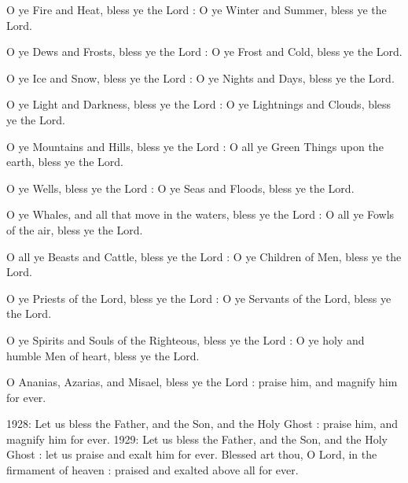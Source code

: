 O ye Fire and Heat, bless ye the Lord : O ye Winter and Summer, bless ye the Lord.

O ye Dews and Frosts, bless ye the Lord : O ye Frost and Cold, bless ye the Lord.

O ye Ice and Snow, bless ye the Lord : O ye Nights and Days, bless ye the Lord.

O ye Light and Darkness, bless ye the Lord : O ye Lightnings and Clouds, bless ye the Lord.


O ye Mountains and Hills, bless ye the Lord : O all ye Green Things upon the earth, bless ye the Lord.

O ye Wells, bless ye the Lord : O ye Seas and Floods, bless ye the Lord.

O ye Whales, and all that move in the waters, bless ye the Lord : O all ye Fowls of the air, bless ye the Lord.

O all ye Beasts and Cattle, bless ye the Lord : O ye Children of Men, bless ye the Lord.


O ye Priests of the Lord, bless ye the Lord : O ye Servants of the Lord, bless ye the Lord.

O ye Spirits and Souls of the Righteous, bless ye the Lord : O ye holy and humble Men of heart, bless ye the Lord.

O Ananias, Azarias, and Misael, bless ye the Lord : praise him, and magnify him for ever.

1928: Let us bless the Father, and the Son, and the Holy Ghost : praise him, and magnify him for ever.
1929: Let us bless the Father, and the Son, and the Holy Ghost : let us praise and exalt him for ever.
Blessed art thou, O Lord, in the firmament of heaven : praised and exalted above all for ever.


\subsection{}

